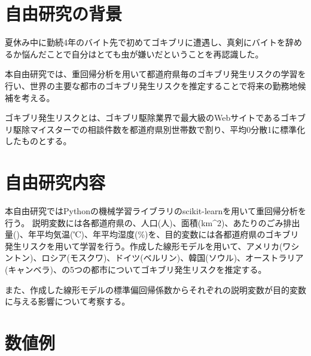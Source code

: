\documentclass[a4paper,10pt,twocolumn]{jsarticle}
\begin{document}



\section{自由研究の背景}
夏休み中に勤続4年のバイト先で初めてゴキブリに遭遇し、真剣にバイトを辞めるか悩んだことで自分はとても虫が嫌いだということを再認識した。

本自由研究では、重回帰分析を用いて都道府県毎のゴキブリ発生リスクの学習を行い、世界の主要な都市のゴキブリ発生リスクを推定することで将来の勤務地候補を考える。

ゴキブリ発生リスクとは、ゴキブリ駆除業界で最大級のWebサイトであるゴキブリ駆除マイスター\cite{cockroach}での相談件数を都道府県別世帯数で割り、平均0分散1に標準化したものとする。

\section{自由研究内容}
本自由研究ではPythonの機械学習ライブラリのscikit-learnを用いて重回帰分析を行う。
説明変数には各都道府県の、人口(人)、面積(km^2)、あたりのごみ排出量()、年平均気温(℃)、年平均湿度(\%)を、目的変数には各都道府県のゴキブリ発生リスクを用いて学習を行う。作成した線形モデルを用いて、アメリカ(ワシントン)、ロシア(モスクワ)、ドイツ(ベルリン)、韓国(ソウル)、オーストラリア(キャンベラ)、の5つの都市についてゴキブリ発生リスクを推定する。

また、作成した線形モデルの標準偏回帰係数からそれぞれの説明変数が目的変数に与える影響について考察する。

\section{数値例}
\end{document}
